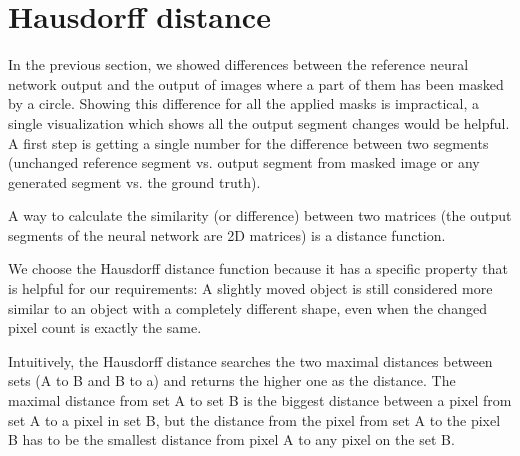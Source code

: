 \section{Hausdorff distance}
\label{hausdorff_distance_chapter}

In the previous section, we showed differences between the reference neural network output and the output of images where a part of them has been masked by a circle.
Showing this difference for all the applied masks is impractical, a single visualization which shows all the output segment changes would be helpful.
A first step is getting a single number for the difference between two segments (unchanged reference segment vs. output segment from masked image or any generated segment vs. the ground truth).

A way to calculate the similarity (or difference) between two matrices (the output segments of the neural network are 2D matrices) is a distance function.

We choose the Hausdorff distance function because it has a specific property that is helpful for our requirements: A slightly moved object is still considered more similar to
an object with a completely different shape, even when the changed pixel count is exactly the same.


Intuitively, the Hausdorff distance searches the two maximal distances between sets (A to B and B to a) and returns the higher one as the distance.
The maximal distance from set A to set B is the biggest distance between a pixel from set A to a pixel in set B, but the distance from the pixel from set A to the pixel B has to be the smallest distance from pixel A to any pixel on the set B.

